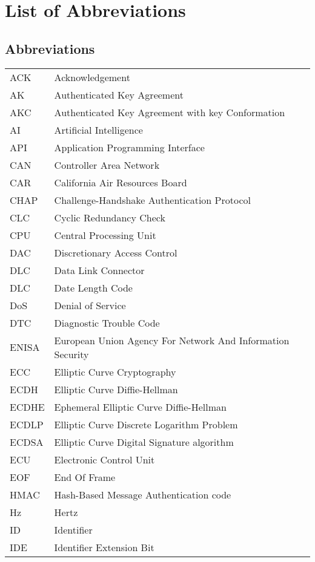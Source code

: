 \documentclass[master=cws,masteroption=vs,english,extralanguage=dutch]{kulemt}
\begin{document}
\listoffiguresandtables

\chapter{List of Abbreviations}
\section*{Abbreviations}

	\renewcommand{\arraystretch}{1.1}
	\begin{tabularx}{\textwidth}{@{}p{14mm}X@{}}
	ACK & Acknowledgement \\
	AK & Authenticated Key Agreement \\
	AKC & Authenticated Key Agreement with key Conformation \\
	AI & Artificial Intelligence \\
	API & Application Programming Interface \\
	CAN & Controller Area Network \\
	CAR & California Air Resources Board \\
	CHAP & Challenge-Handshake Authentication Protocol \\
	CLC & Cyclic Redundancy Check \\
	CPU & Central Processing Unit \\
	DAC & Discretionary Access Control \\
	DLC & Data Link Connector \\
	DLC & Date Length Code \\
	DoS & Denial of Service \\
	DTC & Diagnostic Trouble Code \\
	ENISA & European Union Agency For Network And Information Security \\
	ECC & Elliptic Curve Cryptography \\
	ECDH & Elliptic Curve Diffie-Hellman \\
	ECDHE & Ephemeral Elliptic Curve Diffie-Hellman \\
	ECDLP & Elliptic Curve Discrete Logarithm Problem \\
	ECDSA & Elliptic Curve Digital Signature algorithm \\
	ECU & Electronic Control Unit \\
	EOF & End Of Frame \\
	HMAC & Hash-Based Message Authentication code \\
	Hz & Hertz \\
	ID & Identifier \\
	IDE & Identifier Extension Bit \\
	\end{tabularx}
\end{document}
